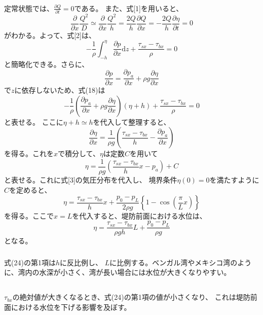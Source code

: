 \documentclass[a4paper]{jsarticle}
\begin{document}
\subsubsection{}
定常状態では、$\frac{\partial Q}{\partial t} = 0$である。
また、式[1]を用いると、
\begin{equation}
  \frac{\partial}{\partial x} \frac{Q^2}{D}
  \simeq \frac{\partial}{\partial x} \frac{Q^2}{h}
  = \frac{2Q}{h} \frac{\partial Q}{\partial x}
  = -\frac{2Q}{h} \frac{\partial \eta}{\partial t} = 0
\end{equation}
がわかる。よって、式[2]は、
\begin{equation}
  -\frac{1}{\rho} 
  \int_{-h}^{\eta} \frac{\partial p}{\partial x} \mathrm{d} z
  + \frac{\tau_{sx} - \tau_{bx}}{\rho} = 0
\end{equation}
と簡略化できる。さらに、
\begin{equation}
  \frac{\partial p}{\partial x}
  = \frac{\partial p_a}{\partial x} + \rho g \frac{\partial \eta}{\partial x}
\end{equation}
で$z$に依存しないため、式(18)は
\begin{equation}
  -\frac{1}{\rho} 
  \left(\frac{\partial p_a}{\partial x}
  + \rho g \frac{\partial \eta}{\partial x}\right)
  (\eta + h)
  + \frac{\tau_{sx} - \tau_{bx}}{\rho} = 0
\end{equation}
と表せる。
ここに$\eta + h \simeq h$を代入して整理すると、
\begin{equation}
  \frac{\partial \eta}{\partial x}
  = \frac{1}{\rho g}
  \left(\frac{\tau_{sx} - \tau_{bx}}{h} - \frac{\partial p_a}{\partial x}\right)
\end{equation}
を得る。これを$x$で積分して、$\eta$は定数$C$を用いて
\begin{equation}
  \eta = \frac{1}{\rho g}
  \left(\frac{\tau_{sx} - \tau_{bx}}{h} x - p_a\right) + C
\end{equation}
と表せる。これに式[3]の気圧分布を代入し、
境界条件$\eta(0) = 0$を満たすように$C$を定めると、
\begin{equation}
  \eta = \frac{\tau_{sx} - \tau_{bx}}{h} x + 
  \frac{p_0 - p_L}{2 \rho g}
  \left\{1 - \cos \left(\frac{\pi}{L} x\right)\right\}
\end{equation}
を得る。ここで$x = L$を代入すると、堤防前面における水位は、
\begin{equation}
  \eta = \frac{\tau_{sx} - \tau_{bx}}{\rho g h} L + \frac{p_0 - p_L}{\rho g}
\end{equation}
となる。
\subsubsection{}
式(24)の第1項は$h$に反比例し、
$L$に比例する。ベンガル湾やメキシコ湾のように、湾内の水深が小さく、湾が長い場合には水位が大きくなりやすい。

\subsection{}
$\tau_{bx}$の絶対値が大きくなるとき、式(24)の第1項の値が小さくなり、
これは堤防前面における水位を下げる影響を及ぼす。
\end{document}
